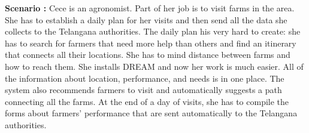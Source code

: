 \begin{flushleft}
\textbf{Scenario :} 
Cece is an agronomist. Part of her job is to visit farms in the area. She has to establish a daily plan for her visits and then send all the data she collects to the Telangana authorities. The daily plan his very hard to create: she has to search for farmers that need more help than others and find an itinerary that connects all their locations. She has to mind distance between farms and how to reach them. She installs DREAM and now her work is much easier. All of the information about location, performance, and needs is in one place. The system also recommends farmers to visit and automatically suggests a path connecting all the farms. At the end of a day of visits, she has to compile the forms about farmers' performance that are sent automatically to the Telangana authorities.
\end{flushleft}